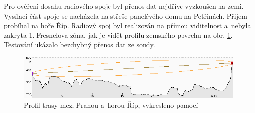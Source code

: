 \documentclass[twoside]{ctuthesis}
\theoremstyle{plain}
\theoremstyle{definition}
\theoremstyle{note}
\begin{document}
	

	Pro ověření dosahu radiového spoje byl přenos dat nejdříve vyzkoušen na zemi. Vysílací část spoje se nacházela na střeše panelévého domu na Petřinách. Přijem probíhal na hoře Říp. Radiový spoj byl realizován na přímou viditelnost a~nebyla zakryta 1. Fresnelova zóna, jak je vidět profilu zemského povrchu na obr. \ref{fig:praha:rip}. Testování ukázalo bezchybný přenos dat ze sondy.

	\begin{figure}[hbtp]
		\centering
		\includegraphics[width=\textwidth]{Figures/petriny_rip.png}
		\caption{Profil trasy mezi Prahou a~horou Říp, vykresleno pomocí \cite{rozhled}}
		\label{fig:praha:rip}
	\end{figure}








	

	





























	

	
\end{document}
